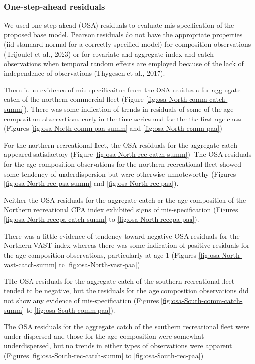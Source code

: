 \documentclass[
]{article}
\begin{document}
\hypertarget{one-step-ahead-residuals}{%
\subsubsection{One-step-ahead residuals}\label{one-step-ahead-residuals}}

We used one-step-ahead (OSA) residuals to evaluate mis-specification of the proposed base model. Pearson residuals do not have the appropriate properties (iid standard normal for a correctly specified model) for composition observations (Trijoulet et al., 2023) or for covariate and aggregate index and catch observations when temporal random effects are employed because of the lack of independence of observations (Thygesen et al., 2017).

There is no evidence of mis-specificaiton from the OSA residuals for aggregate catch of the northern commercial fleet (Figure \ref{fig:osa-North-comm-catch-summ}). There was some indication of trends in residuals of some of the age composition observations early in the time series and for the the first age class (Figures \ref{fig:osa-North-comm-paa-summ} and \ref{fig:osa-North-comm-paa}).

For the northern recreational fleet, the OSA residuals for the aggregate catch appeared satisfactory (Figure \ref{fig:osa-North-rec-catch-summ}). The OSA residuals for the age composition observations for the northern recreational fleet showed some tendency of underdispersion but were otherwise unnoteworthy (Figures \ref{fig:osa-North-rec-paa-summ} and \ref{fig:osa-North-rec-paa}).

Neither the OSA residuals for the aggregate catch or the age composition of the Northern recreational CPA index exhibited signs of mis-specification (Figures \ref{fig:osa-North-reccpa-catch-summ} to \ref{fig:osa-North-reccpa-paa}).

There was a little evidence of tendency toward negative OSA residuals for the Northern VAST index whereas there was some indication of positive residuals for the age composition observations, particularly at age 1 (Figures \ref{fig:osa-North-vast-catch-summ} to \ref{fig:osa-North-vast-paa})

THe OSA residuals for the aggregate catch of the southern recreational fleet tended to be negative, but the residuals for the age composition observations did not show any evidence of mis-specification (Figures \ref{fig:osa-South-comm-catch-summ} to \ref{fig:osa-South-comm-paa}).

The OSA residuals for the aggregate catch of the southern recreational fleet were under-dispersed and those for the age composition were somewhat underdispersed, but no trends in either types of observations were apparent (Figures \ref{fig:osa-South-rec-catch-summ} to \ref{fig:osa-South-rec-paa})
\end{document}
